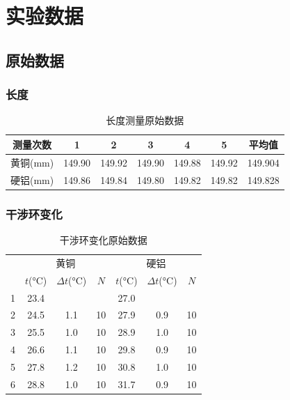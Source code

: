 \section{实验数据}
\subsection{原始数据}
\subsubsection{长度}
\begin{table}[!ht]
    \caption{长度测量原始数据}
    \begin{tabular}{*{7}{c}} \toprule
        测量次数 & 1 & 2 & 3 & 4 & 5 & 平均值  \\ \midrule
        黄铜(\unit{\mm}) & 149.90 & 149.92 & 149.90 & 149.88 & 149.92 & 149.904 \\ 
        硬铝(\unit{\mm}) & 149.86 & 149.84 & 149.80 & 149.82 & 149.82 & 149.828 \\ \bottomrule
    \end{tabular}
\end{table}
\subsubsection{干涉环变化}
\begin{table}[!ht]
    \caption{干涉环变化原始数据}
    \begin{tabular}{*{7}{c}}\toprule
        & \multicolumn{3}{c}{黄铜} & \multicolumn{3}{c}{硬铝} \\ 
        & $t$(\unit{\degreeCelsius}) & $\Delta t$(\unit{\degreeCelsius}) & $N$ & $t$(\unit{\degreeCelsius}) & $\Delta t$(\unit{\degreeCelsius}) & $N$  \\ \midrule
       1 & 23.4 &     &    & 27.0 &     &    \\ 
       2 & 24.5 & 1.1 & 10 & 27.9 & 0.9 & 10 \\ 
       3 & 25.5 & 1.0 & 10 & 28.9 & 1.0 & 10 \\ 
       4 & 26.6 & 1.1 & 10 & 29.8 & 0.9 & 10 \\ 
       5 & 27.8 & 1.2 & 10 & 30.8 & 1.0 & 10 \\ 
       6 & 28.8 & 1.0 & 10 & 31.7 & 0.9 & 10 \\ \bottomrule
    \end{tabular}
\end{table}
